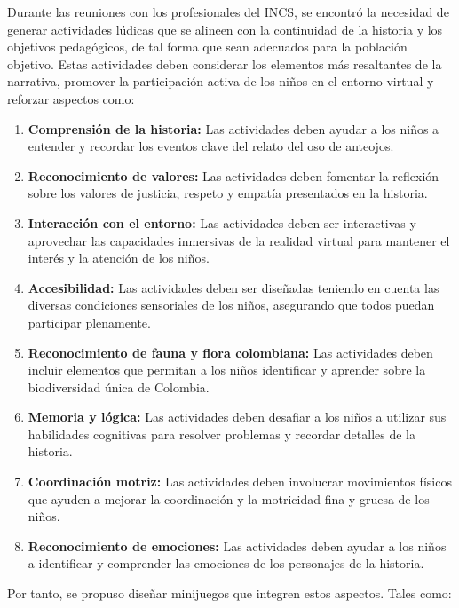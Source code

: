 Durante las reuniones con los profesionales del INCS, se encontró la necesidad de generar actividades lúdicas que se alineen con la continuidad de la historia y los objetivos pedagógicos, de tal forma que sean adecuados para la población objetivo.
Estas actividades deben considerar los elementos más resaltantes de la narrativa, promover la participación activa de los niños en el entorno virtual y reforzar aspectos como:
\begin{enumerate}
    \item \textbf{Comprensión de la historia:} Las actividades deben ayudar a los niños a entender y recordar los eventos clave del relato del oso de anteojos.
    \item \textbf{Reconocimiento de valores:} Las actividades deben fomentar la reflexión sobre los valores de justicia, respeto y empatía presentados en la historia.
    \item \textbf{Interacción con el entorno:} Las actividades deben ser interactivas y aprovechar las capacidades inmersivas de la realidad virtual para mantener el interés y la atención de los niños.
    \item \textbf{Accesibilidad:} Las actividades deben ser diseñadas teniendo en cuenta las diversas condiciones sensoriales de los niños, asegurando que todos puedan participar plenamente.
    \item \textbf{Reconocimiento de fauna y flora colombiana:} Las actividades deben incluir elementos que permitan a los niños identificar y aprender sobre la biodiversidad única de Colombia.
    \item \textbf{Memoria y lógica:} Las actividades deben desafiar a los niños a utilizar sus habilidades cognitivas para resolver problemas y recordar detalles de la historia.
    \item \textbf{Coordinación motriz:} Las actividades deben involucrar movimientos físicos que ayuden a mejorar la coordinación y la motricidad fina y gruesa de los niños.
    \item \textbf{Reconocimiento de emociones:} Las actividades deben ayudar a los niños a identificar y comprender las emociones de los personajes de la historia.
\end{enumerate}
Por tanto, se propuso diseñar minijuegos que integren estos aspectos. Tales como:
